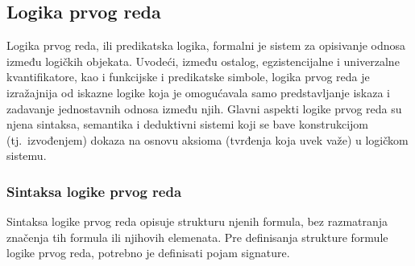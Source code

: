 \documentclass[a4paper,10pt]{article}
\begin{document}
\subsection{Logika prvog reda}
\label{subsec:logika_prvog_reda}

Logika prvog reda, ili predikatska logika, formalni je sistem za opisivanje odnosa između logičkih objekata. Uvodeći, između ostalog, egzistencijalne i univerzalne kvantifikatore, kao i funkcijske i predikatske simbole, logika prvog reda je izražajnija od iskazne logike koja je omogućavala samo predstavljanje iskaza i zadavanje jednostavnih odnosa između njih. Glavni aspekti logike prvog reda su njena sintaksa, semantika i deduktivni sistemi koji se bave konstrukcijom (tj.~izvođenjem) dokaza na osnovu aksioma (tvrđenja koja uvek važe) u logičkom sistemu.

\subsubsection{Sintaksa logike prvog reda}

Sintaksa logike prvog reda opisuje strukturu njenih formula, bez razmatranja značenja tih formula ili njihovih elemenata. Pre definisanja strukture formule logike prvog reda, potrebno je definisati pojam signature.
\end{document}
